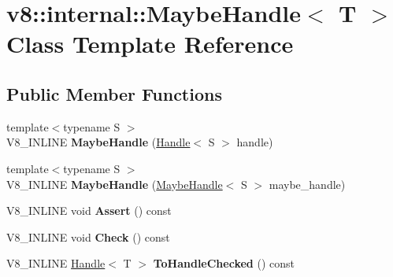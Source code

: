 \hypertarget{classv8_1_1internal_1_1_maybe_handle}{}\section{v8\+:\+:internal\+:\+:Maybe\+Handle$<$ T $>$ Class Template Reference}
\label{classv8_1_1internal_1_1_maybe_handle}
\subsection*{Public Member Functions}
\begin{DoxyCompactItemize}
\item 
{\footnotesize template$<$typename S $>$ }\\V8\+\_\+\+I\+N\+L\+I\+NE {\bfseries Maybe\+Handle} (\hyperlink{classv8_1_1internal_1_1_handle}{Handle}$<$ S $>$ handle)\hypertarget{classv8_1_1internal_1_1_maybe_handle_ad1fdd92ebc1720ff20b8d4dafb134be5}{}\label{classv8_1_1internal_1_1_maybe_handle_ad1fdd92ebc1720ff20b8d4dafb134be5}

\item 
{\footnotesize template$<$typename S $>$ }\\V8\+\_\+\+I\+N\+L\+I\+NE {\bfseries Maybe\+Handle} (\hyperlink{classv8_1_1internal_1_1_maybe_handle}{Maybe\+Handle}$<$ S $>$ maybe\+\_\+handle)\hypertarget{classv8_1_1internal_1_1_maybe_handle_abf3aa86a5cd1e6a4a371a2e0f7d7e6c5}{}\label{classv8_1_1internal_1_1_maybe_handle_abf3aa86a5cd1e6a4a371a2e0f7d7e6c5}

\item 
V8\+\_\+\+I\+N\+L\+I\+NE void {\bfseries Assert} () const \hypertarget{classv8_1_1internal_1_1_maybe_handle_a16f67422c6ac61513dc1ac68d5c08817}{}\label{classv8_1_1internal_1_1_maybe_handle_a16f67422c6ac61513dc1ac68d5c08817}

\item 
V8\+\_\+\+I\+N\+L\+I\+NE void {\bfseries Check} () const \hypertarget{classv8_1_1internal_1_1_maybe_handle_a3a42a5b4a3e6b897b82e52501f7bb331}{}\label{classv8_1_1internal_1_1_maybe_handle_a3a42a5b4a3e6b897b82e52501f7bb331}

\item 
V8\+\_\+\+I\+N\+L\+I\+NE \hyperlink{classv8_1_1internal_1_1_handle}{Handle}$<$ T $>$ {\bfseries To\+Handle\+Checked} () const \hypertarget{classv8_1_1internal_1_1_maybe_handle_a49fd7e0595e06405e494d143603dbfae}{}\label{classv8_1_1internal_1_1_maybe_handle_a49fd7e0595e06405e494d143603dbfae}


\end{DoxyCompactItemize}
